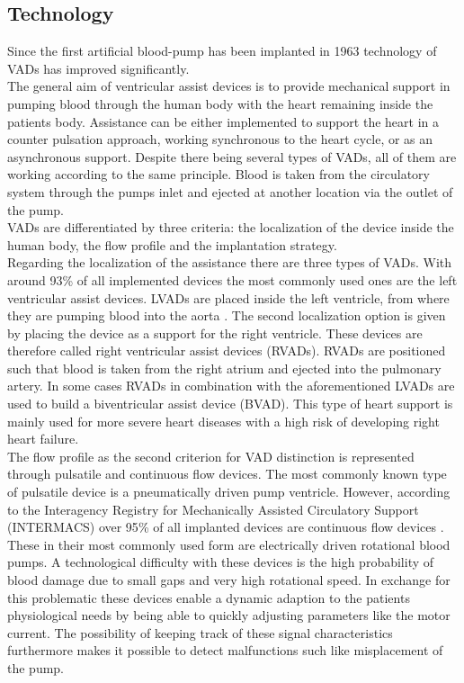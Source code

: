 \subsection{Technology}
Since the first artificial blood-pump has been implanted in 1963 \cite{VAD9} technology of VADs has improved significantly.
\\The general aim of ventricular assist devices is to provide mechanical support in pumping blood through the human body with the heart remaining inside the patients body. Assistance can be either implemented to support the heart in a counter pulsation approach, working synchronous to the heart cycle, or as an asynchronous support. Despite there being several types of VADs, all of them are working according to the same principle. Blood is taken from the circulatory system through the pumps inlet and ejected at another location via the outlet of the pump.\cite{VAD1}
\\VADs are differentiated by three criteria: the localization of the device inside the human body, the flow profile and the implantation strategy.
\\Regarding the localization of the assistance there are three types of VADs. With around 93{\%} of all implemented devices the most commonly used ones are the left ventricular assist devices.\cite{VAD7} LVADs are placed inside the left ventricle, from where they are pumping blood into the aorta \cite{VAD4}. The second localization option is given by placing the device as a support for  the right ventricle. These devices are therefore called right ventricular assist devices (RVADs). RVADs are positioned such that blood is taken from the right atrium and ejected into the pulmonary artery. \cite{VAD7} In some cases RVADs in combination with the aforementioned LVADs are used to build a biventricular assist device (BVAD). This type of heart support is mainly used for more severe heart diseases with a high risk of developing right heart failure. \cite{VAD11} 
\\The flow profile as the second criterion for VAD distinction is represented through pulsatile and continuous flow devices. The most commonly known type of pulsatile device is a pneumatically driven pump ventricle. \cite{VAD1}
However, according to the Interagency Registry for Mechanically Assisted Circulatory Support (INTERMACS) over 95{\%} of all implanted devices are continuous flow devices \cite{VAD8}. These in their most commonly used form are electrically driven rotational blood pumps. A technological difficulty with these devices is the high probability of blood damage due to small gaps and very high rotational speed. In exchange for this problematic these devices enable a dynamic adaption to the patients physiological needs by being able to quickly adjusting parameters like the motor current. The possibility of keeping track of these signal characteristics furthermore makes it possible to detect malfunctions such like misplacement of the pump. \cite{VAD1}
